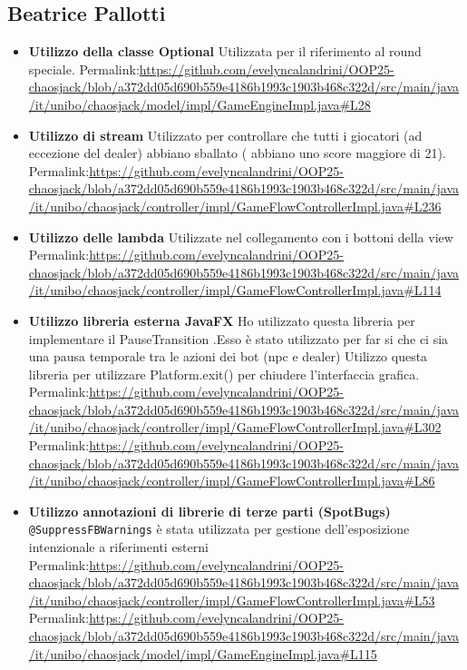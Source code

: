 \documentclass[a4paper,12pt]{report}
\begin{document}
\subsection*{Beatrice Pallotti}
\begin{itemize}
	\item \textbf{Utilizzo della classe Optional}
	Utilizzata per il riferimento al round speciale.
	Permalink:\url{https://github.com/evelyncalandrini/OOP25-chaosjack/blob/a372dd05d690b559e4186b1993c1903b468c322d/src/main/java/it/unibo/chaosjack/model/impl/GameEngineImpl.java#L28}
	\item \textbf{Utilizzo di stream}
	Utilizzato per controllare  che tutti i giocatori (ad eccezione del dealer) abbiano sballato ( abbiano uno score maggiore di 21).
	Permalink:\url{https://github.com/evelyncalandrini/OOP25-chaosjack/blob/a372dd05d690b559e4186b1993c1903b468c322d/src/main/java/it/unibo/chaosjack/controller/impl/GameFlowControllerImpl.java#L236}
	\item \textbf{Utilizzo delle lambda}
	Utilizzate nel collegamento con i bottoni della view
	Permalink:\url{https://github.com/evelyncalandrini/OOP25-chaosjack/blob/a372dd05d690b559e4186b1993c1903b468c322d/src/main/java/it/unibo/chaosjack/controller/impl/GameFlowControllerImpl.java#L114}
	\item \textbf{Utilizzo libreria esterna JavaFX}
	Ho utilizzato questa libreria per implementare il PauseTransition .Esso è stato utilizzato per far si che ci sia una pausa temporale tra le azioni dei bot (npc e dealer)
	Utilizzo questa libreria per utilizzare Platform.exit() per chiudere l'interfaccia grafica.
	Permalink:\url{https://github.com/evelyncalandrini/OOP25-chaosjack/blob/a372dd05d690b559e4186b1993c1903b468c322d/src/main/java/it/unibo/chaosjack/controller/impl/GameFlowControllerImpl.java#L302}
	Permalink:\url{https://github.com/evelyncalandrini/OOP25-chaosjack/blob/a372dd05d690b559e4186b1993c1903b468c322d/src/main/java/it/unibo/chaosjack/controller/impl/GameFlowControllerImpl.java#L86}
	\item \textbf{Utilizzo annotazioni di librerie di terze parti (SpotBugs)}
	\texttt{@SuppressFBWarnings} è stata utilizzata per gestione dell'esposizione intenzionale a riferimenti esterni
	Permalink:\url{https://github.com/evelyncalandrini/OOP25-chaosjack/blob/a372dd05d690b559e4186b1993c1903b468c322d/src/main/java/it/unibo/chaosjack/controller/impl/GameFlowControllerImpl.java#L53}
	Permalink:\url{https://github.com/evelyncalandrini/OOP25-chaosjack/blob/a372dd05d690b559e4186b1993c1903b468c322d/src/main/java/it/unibo/chaosjack/model/impl/GameEngineImpl.java#L115}
\end{itemize}
\end{document}
